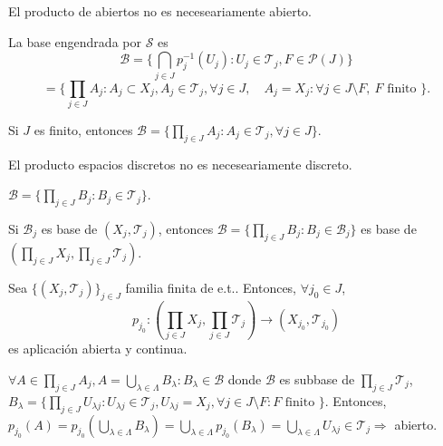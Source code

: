 \begin{obs}
  El producto de abiertos no es neceseariamente abierto.
\end{obs}

\begin{obs}
La base engendrada por $\mathcal{S}$ es 
\[ 
  \mathcal{B} = \big\{ \bigcap_{j \in J} p_{j}^{-1}(U_{j}) : U_{j} \in \mathcal{T}_{j}, F \in \mathcal{P}(J) \big\}
\]
\[ 
  = \big\{  \prod_{j \in J} A_{j} : A_{j} \subset X_{j}, A_{j} \in \mathcal{T}_{j}, \forall j \in J, \quad A_{j} = X_{j} : \forall j \in J \setminus F, \ F \text{ finito } \big\}.
\] 
\end{obs}

\begin{obs}
  Si $J$ es finito, entonces $ \mathcal{B} = \big\{ \prod_{j \in J} A_{j}: A_{j} \in \mathcal{T}_{j}, \forall j \in J \big\}$.
\end{obs}

\begin{obs}
  El producto espacios discretos no es neceseariamente discreto.
\end{obs}

\begin{obs}
  $\mathcal{B} = \{  \prod_{j \in J} B_{j} : B_{j} \in \mathcal{T}_{j}\}$.
\end{obs}

\begin{obs}
  Si $\mathcal{B}_{j}$ es base de $( X_{j}, \mathcal{T}_{j} )$, entonces $\mathcal{B} = \{ \prod_{j \in J} B_{j} : B_{j} \in \mathcal{B}_{j} \}$ es base de $( \prod_{j \in J} X_{j}, \prod_{j \in J} \mathcal{T}_{j} )$.
\end{obs}

\begin{prop}
  Sea $\{( X_{j}, \mathcal{T}_{j} )\}_{j \in J}$ familia finita de e.t.. Entonces, $\forall j_{0} \in J$, 
  \[ 
    p_{j_{0}}: ( \prod_{j \in J} X_{j}, \prod_{j \in J} \mathcal{T}_{j} ) \to ( X_{j_{0}}, \mathcal{T}_{j_{0}} )
  \] 
  es aplicación abierta y continua.
\end{prop}

\begin{dem}
  $\forall A \in \prod_{j \in J} A_{j}, A = \bigcup_{\lambda \in \Lambda} B_{\lambda} : B_{\lambda} \in \mathcal{B}$ donde $\mathcal{B}$ es subbase de $\prod_{j \in J} \mathcal{T}_{j}$, $B_{\lambda} = \{ \prod_{j \in J} U_{\lambda j}: U_{\lambda j} \in \mathcal{T}_{j}, U_{\lambda j} = X_{j}, \forall j \in J \setminus F: F \text{ finito }\}$. Entonces, $p_{j_{0}}(A) = p_{j_{0}}(\bigcup_{\lambda \in \Lambda} B_{\lambda}) = \bigcup_{\lambda \in \Lambda} p_{j_{0}}(B_{\lambda}) = \bigcup_{\lambda \in \Lambda} U_{\lambda j} \in \mathcal{T}_{j} \Rightarrow $ abierto.
\end{dem}


